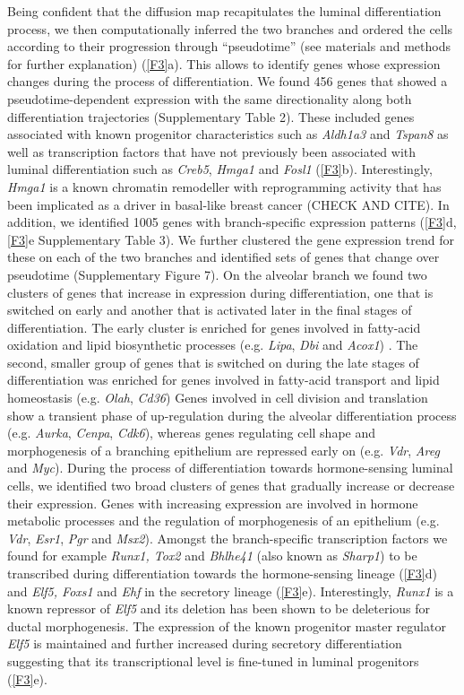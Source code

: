 \documentclass[titlepage, 12pt, oneside]{amsart}
\begin{document}
Being confident that the diffusion map recapitulates the luminal differentiation process, we then computationally inferred the two branches and ordered the cells according to their progression through ``pseudotime''\autocite{Haghverdi2016} (see materials and methods for further explanation) (\autoref{F3}a).
This allows to identify genes whose expression changes during the process of differentiation.
We found 456 genes that showed a pseudotime-dependent expression with the same directionality along both differentiation trajectories (Supplementary Table 2).
These included genes associated with known progenitor characteristics such as \textit{Aldh1a3} and \textit{Tspan8} as well as transcription factors that have not previously been associated with luminal differentiation such as \textit{Creb5}, \textit{Hmga1} and \textit{Fosl1} (\autoref{F3}b).
Interestingly, \textit{Hmga1} is a known chromatin remodeller with reprogramming activity that has been implicated as a driver in basal-like breast cancer (CHECK AND CITE).
In addition, we identified 1005 genes with branch-specific expression patterns (\autoref{F3}d, \autoref{F3}e Supplementary Table 3).
We further clustered the gene expression trend for these on each of the two branches and identified sets of genes that change over pseudotime (Supplementary Figure 7).
On the alveolar branch we found two clusters of genes that increase in expression during differentiation, one that is switched on early and another that is activated later in the final stages of differentiation.
The early cluster is enriched for genes involved in fatty-acid oxidation and lipid biosynthetic processes (e.g. \textit{Lipa}, \textit{Dbi} and \textit{Acox1}) .
The second, smaller group of genes that is switched on during the late stages of differentiation was enriched for genes involved in fatty-acid transport and lipid homeostasis (e.g. \textit{Olah}, \textit{Cd36})
Genes involved in cell division and translation show a transient phase of up-regulation during the alveolar differentiation process (e.g. \textit{Aurka}, \textit{Cenpa}, \textit{Cdk6}), whereas genes regulating cell shape and morphogenesis of a branching epithelium are repressed early on (e.g. \textit{Vdr}, \textit{Areg} and \textit{Myc}).
During the process of differentiation towards hormone-sensing luminal cells, we identified two broad clusters of genes that gradually increase or decrease their expression.
Genes with increasing expression are involved in hormone metabolic processes and the regulation of morphogenesis of an epithelium (e.g. \textit{Vdr}, \textit{Esr1}, \textit{Pgr} and \textit{Msx2}).
Amongst the branch-specific transcription factors we found for example \textit{Runx1, Tox2} and \textit{Bhlhe41} (also known as \textit{Sharp1}) to be transcribed during differentiation towards the hormone-sensing lineage (\autoref{F3}d) and \textit{Elf5, Foxs1} and \textit{Ehf} in the secretory lineage (\autoref{F3}e).
Interestingly, \textit{Runx1} is a known repressor of \textit{Elf5} and its deletion has been shown to be deleterious for ductal morphogenesis\autocite{VanBragt2014}.
The expression of the known progenitor master regulator \textit{Elf5} is maintained and further increased during secretory differentiation suggesting that its transcriptional level is fine-tuned in luminal progenitors (\autoref{F3}e).
\end{document}

